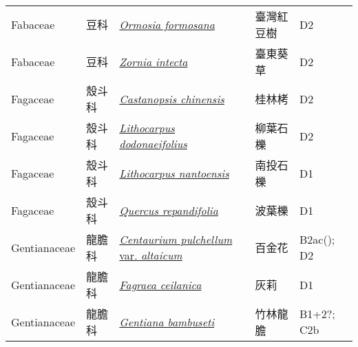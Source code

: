 {\begin{longtable}{L{2.5cm}L{2cm}L{5cm}L{2.5cm}L{3cm}}
    Fabaceae & 豆科 & \href{http://www.theplantlist.org/tpl1.1/search?q=Ormosia+formosana}{\textit{Ormosia formosana} } & 臺灣紅豆樹 & D2    \\
    Fabaceae & 豆科 & \href{http://www.theplantlist.org/tpl1.1/search?q=Zornia+intecta}{\textit{Zornia intecta} } & 臺東葵草 & D2    \\
    Fagaceae & 殼斗科 & \href{http://www.theplantlist.org/tpl1.1/search?q=Castanopsis+chinensis}{\textit{Castanopsis chinensis} } & 桂林栲 & D2    \\
    Fagaceae & 殼斗科 & \href{http://www.theplantlist.org/tpl1.1/search?q=Lithocarpus+dodonaeifolius}{\textit{Lithocarpus dodonaeifolius} } & 柳葉石櫟 & D2    \\
    Fagaceae & 殼斗科 & \href{http://www.theplantlist.org/tpl1.1/search?q=Lithocarpus+nantoensis}{\textit{Lithocarpus nantoensis} } & 南投石櫟 & D1    \\
    Fagaceae & 殼斗科 & \href{http://www.theplantlist.org/tpl1.1/search?q=Quercus+repandifolia}{\textit{Quercus repandifolia} } & 波葉櫟 & D1    \\
    Gentianaceae & 龍膽科 & \href{http://www.theplantlist.org/tpl1.1/search?q=Centaurium+pulchellum+var.+altaicum}{\textit{Centaurium pulchellum} var. \textit{altaicum} } & 百金花 & B2ac(); D2    \\
    Gentianaceae & 龍膽科 & \href{http://www.theplantlist.org/tpl1.1/search?q=Fagraea+ceilanica}{\textit{Fagraea ceilanica} } & 灰莉 & D1    \\
    Gentianaceae & 龍膽科 & \href{http://www.theplantlist.org/tpl1.1/search?q=Gentiana+bambuseti}{\textit{Gentiana bambuseti} } & 竹林龍膽 & B1+2?; C2b    \\

\end{longtable}}
